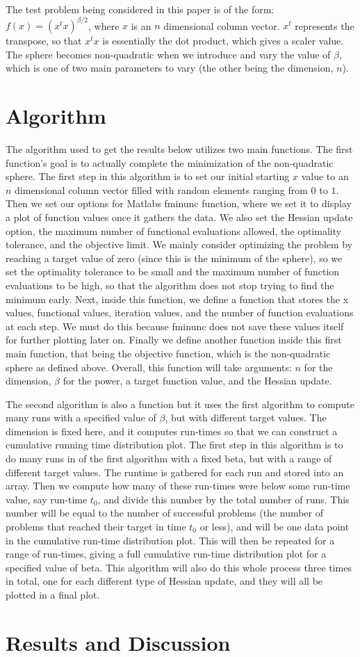 \documentclass[sigconf, 10pt]{acmart}
\begin{document}
The test problem being considered in this paper is of the form: $f(x)=(x^tx)^{\beta/2}$, where $x$ is an $n$ dimensional column vector. $x^t$ represents the transpose, so that $x^tx$ is essentially the dot product, which gives a scaler value. The sphere becomes non-quadratic when we introduce and vary the value of $\beta$, which is one of two main parameters to vary (the other being the dimension, $n$).

\section{Algorithm}
\label{algorithm}
The algorithm used to get the results below utilizes two main functions. The first function's goal is to actually complete the minimization of the non-quadratic sphere. The first step in this algorithm is to set our initial starting $x$ value to an $n$ dimensional column vector filled with random elements ranging from $0$ to $1$. Then we set our options for Matlabs fminunc function, where we set it to display a plot of function values once it gathers the data. We also set the Hessian update option, the maximum number of functional evaluations allowed, the optimality tolerance, and the objective limit. We mainly consider optimizing the problem by reaching a target value of zero (since this is the minimum of the sphere), so we set the optimality tolerance to be small and the maximum number of function evaluations to be high, so that the algorithm does not stop trying to find the minimum early. Next, inside this function, we define a function that stores the x values, functional values, iteration values, and the number of function evaluations at each step. We must do this because fminunc does not save these values itself for further plotting later on. Finally we define another function inside this first main function, that being the objective function, which is the non-quadratic sphere as defined above. Overall, this function will take arguments: $n$ for the dimension, $\beta$ for the power, a target function value, and the Hessian update.

The second algorithm is also a function but it uses the first algorithm to compute many runs with a specified value of $\beta$, but with different target values. The dimension is fixed here, and it computes run-times so that we can construct a cumulative running time distribution plot. The first step in this algorithm is to do many runs in of the first algorithm with a fixed beta, but with a range of different target values. The runtime is gathered for each run and stored into an array. Then we compute how many of these run-times were below some run-time value, say run-time $t_0$, and divide this number by the total number of runs. This number will be equal to the number of successful problems (the number of problems that reached their target in time $t_0$ or less), and will be one data point in the cumulative run-time distribution plot. This will then be repeated for a range of run-times, giving a full cumulative run-time distribution plot for a specified value of beta. This algorithm will also do this whole process three times in total, one for each different type of Hessian update, and they will all be plotted in a final plot.

\section{Results and Discussion}
\label{result}
\end{document}
